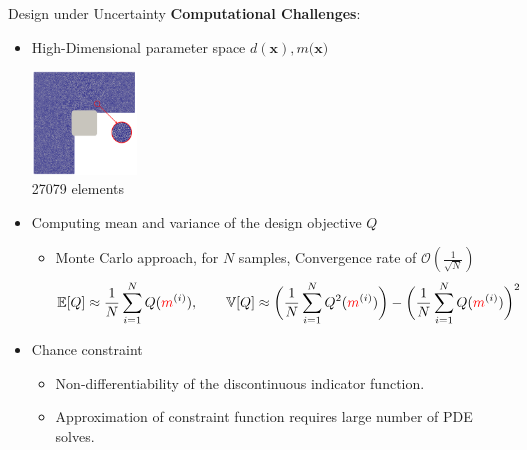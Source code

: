\documentclass[10pt,xcolor=dvipsnames,compress]{beamer}
\begin{document}
\begin{frame}{Design under Uncertainty}
\textbf{Computational Challenges}:
\begin{itemize}
    \item High-Dimensional parameter space $d(\boldsymbol{x}), m(\boldsymbol{x)}$\\
    \begin{center}
        \includegraphics[width=0.22\textwidth]{Figures/mesh.png}\\
        \hspace{-0.1in}\footnotesize{27079 elements}\\
    \end{center}
\end{itemize}
\hfill

\begin{itemize}
    \item Computing mean and variance of the design objective $Q$
            \begin{itemize}
                \item Monte Carlo approach, for $N$ samples, Convergence rate of $\mathcal{O}(\frac{1}{\sqrt{N}})$
                \scriptsize
                \begin{equation*}
                \mathbb{E}[Q] \approx \frac{1}{N}\sum_{i=1}^{N} Q(\textcolor{red}{m}^{(i)})
                ,
                \qquad
                \mathbb{V}[Q] \approx \bigg(\frac{1}{N}\sum_{i=1}^{N} Q^2(\textcolor{red}{m}^{(i)}) \bigg)   -   \bigg(  \frac{1}{N}\sum_{i=1}^{N} Q(\textcolor{red}{m}^{(i)})  \bigg)^2 
                \end{equation*}
            \end{itemize}
\end{itemize}
\begin{itemize}
    \item Chance constraint  
    \begin{itemize}
    \item Non-differentiability of the discontinuous indicator function.
        \item Approximation of constraint function requires large number of PDE solves.
    \end{itemize}
\end{itemize}

\end{frame}
\end{document}
